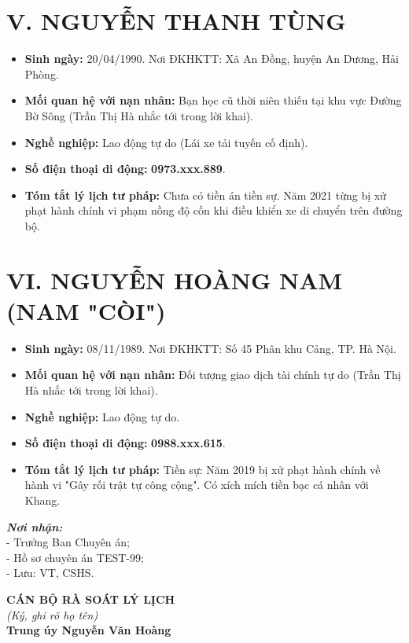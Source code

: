 \documentclass[12pt,a4paper]{article}
\begin{document}
\section*{V. NGUYỄN THANH TÙNG}
\begin{itemize}[leftmargin=1.5cm]
    \item \textbf{Sinh ngày:} 20/04/1990. Nơi ĐKHKTT: Xã An Đồng, huyện An Dương, Hải Phòng.
    \item \textbf{Mối quan hệ với nạn nhân:} Bạn học cũ thời niên thiếu tại khu vực Đường Bờ Sông (Trần Thị Hà nhắc tới trong lời khai).
    \item \textbf{Nghề nghiệp:} Lao động tự do (Lái xe tải tuyến cố định).
    \item \textbf{Số điện thoại di động:} \textbf{0973.xxx.889}.
    \item \textbf{Tóm tắt lý lịch tư pháp:} Chưa có tiền án tiền sự. Năm 2021 từng bị xử phạt hành chính vi phạm nồng độ cồn khi điều khiển xe di chuyển trên đường bộ.
\end{itemize}

\section*{VI. NGUYỄN HOÀNG NAM (NAM "CÒI")}
\begin{itemize}[leftmargin=1.5cm]
    \item \textbf{Sinh ngày:} 08/11/1989. Nơi ĐKHKTT: Số 45 Phân khu Cảng, TP. Hà Nội.
    \item \textbf{Mối quan hệ với nạn nhân:} Đối tượng giao dịch tài chính tự do (Trần Thị Hà nhắc tới trong lời khai).
    \item \textbf{Nghề nghiệp:} Lao động tự do.
    \item \textbf{Số điện thoại di động:} \textbf{0988.xxx.615}.
    \item \textbf{Tóm tắt lý lịch tư pháp:} Tiền sự: Năm 2019 bị xử phạt hành chính về hành vi "Gây rối trật tự công cộng". Có xích mích tiền bạc cá nhân với Khang.
\end{itemize}

\vspace{0.8cm}

\noindent
\begin{minipage}[t]{0.45\textwidth}
    \small
    \textbf{\textit{Nơi nhận:}}\\
    - Trưởng Ban Chuyên án;\\
    - Hồ sơ chuyên án TEST-99;\\
    - Lưu: VT, CSHS.
\end{minipage}
\hfill
\begin{minipage}[t]{0.5\textwidth}
    \begin{center}
        \small
        \textbf{CÁN BỘ RÀ SOÁT LÝ LỊCH}\\
        \textit{(Ký, ghi rõ họ tên)}\\[1.5cm]
        \textbf{Trung úy Nguyễn Văn Hoàng}
    \end{center}
\end{minipage}
\end{document}
